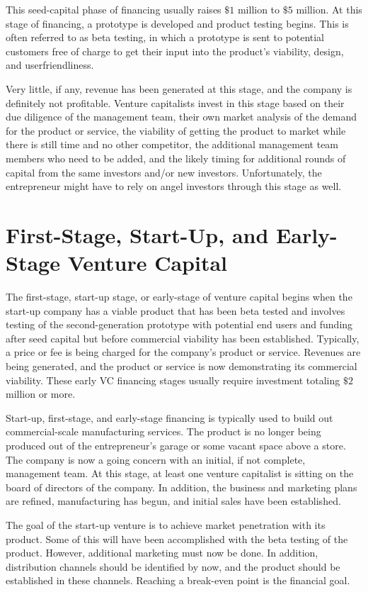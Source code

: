 \documentclass[11pt]{article}
\begin{document}
This seed-capital phase of financing usually raises $\$ 1$ million to $\$ 5$ million. At this stage of financing, a prototype is developed and product testing begins. This is often referred to as beta testing, in which a prototype is sent to potential customers free of charge to get their input into the product's viability, design, and userfriendliness.

Very little, if any, revenue has been generated at this stage, and the company is definitely not profitable. Venture capitalists invest in this stage based on their due diligence of the management team, their own market analysis of the demand for the product or service, the viability of getting the product to market while there is still time and no other competitor, the additional management team members who need to be added, and the likely timing for additional rounds of capital from the same investors and/or new investors. Unfortunately, the entrepreneur might have to rely on angel investors through this stage as well.

\section*{First-Stage, Start-Up, and Early-Stage Venture Capital}
The first-stage, start-up stage, or early-stage of venture capital begins when the start-up company has a viable product that has been beta tested and involves testing of the second-generation prototype with potential end users and funding after seed capital but before commercial viability has been established. Typically, a price or fee is being charged for the company's product or service. Revenues are being generated, and the product or service is now demonstrating its commercial viability. These early VC financing stages usually require investment totaling $\$ 2$ million or more.

Start-up, first-stage, and early-stage financing is typically used to build out commercial-scale manufacturing services. The product is no longer being produced out of the entrepreneur's garage or some vacant space above a store. The company is now a going concern with an initial, if not complete, management team. At this stage, at least one venture capitalist is sitting on the board of directors of the company. In addition, the business and marketing plans are refined, manufacturing has begun, and initial sales have been established.

The goal of the start-up venture is to achieve market penetration with its product. Some of this will have been accomplished with the beta testing of the product. However, additional marketing must now be done. In addition, distribution channels should be identified by now, and the product should be established in these channels. Reaching a break-even point is the financial goal.
\end{document}
